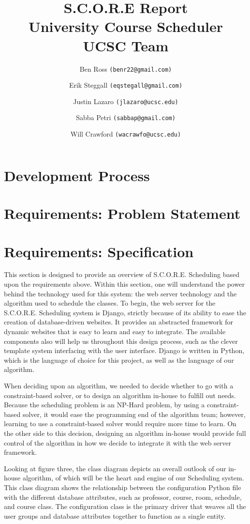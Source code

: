 \documentclass[12pt,article]{memoir}
\title{S.C.O.R.E Report \\ University Course Scheduler \\ UCSC Team}
\author{Ben Ross \texttt{(benr22@gmail.com)} \\
	\and Erik Steggall \texttt{(eqstegall@gmail.com)}\\
	\and Justin Lazaro \texttt{(jlazaro@ucsc.edu)}\\
	\and Sabba Petri \texttt{(sabbap@gmail.com)}\\
	\and Will Crawford \texttt{(wacrawfo@ucsc.edu)}}
\date{}
\begin{document}
\maketitle

\chapter{Development Process} %
\chapter{Requirements: Problem Statement} %
\chapter{Requirements: Specification} %
This section is designed to provide an overview of S.C.O.R.E. Scheduling based upon the requirements above. Within this section, one will understand the power behind the technology used for this system: the web server technology and the algorithm used to schedule the classes. To begin, the web server for the S.C.O.R.E. Scheduling system is Django, strictly because of its ability to ease the creation of database-driven websites. It provides an abstracted framework for dynamic websites that is easy to learn and easy to integrate. The available components also will help us throughout this design process, such as the clever template system interfacing with the user interface. Django is written in Python, which is the language of choice for this project, as well as the language of our algorithm.

When deciding upon an algorithm, we needed to decide whether to go with a constraint-based solver, or to design an algorithm in-house to fulfill out needs. Because the scheduling problem is an NP-Hard problem, by using a constraint-based solver, it would ease the programming end of the algorithm team; however, learning to use a constraint-based solver would require more time to learn. On the other side to this decision, designing an algorithm in-house would provide full control of the algorithm in how we decide to integrate it with the web server framework.

Looking at figure three, the class diagram depicts an overall outlook of our in-house algorithm, of which will be the heart and engine of our Scheduling system. This class diagram shows the relationship between the configuration Python file with the different database attributes, such as professor, course, room, schedule, and course class. The configuration class is the primary driver that weaves all the user groups and database attributes together to function as a single entity.  
\end{document}
